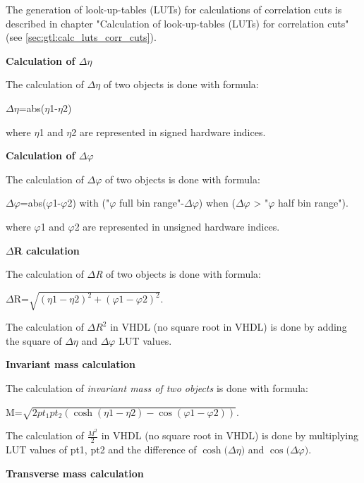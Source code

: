The generation of look-up-tables (LUTs) for calculations of correlation cuts is described in chapter "Calculation of look-up-tables (LUTs) for correlation cuts" (see \ref{sec:gtl:calc_luts_corr_cuts}).

\textbf{Calculation of $\Delta\eta$}
\label{sec:gtl:calculation_delta_eta}

The calculation of \textit{$\Delta\eta$} of two objects is done with formula:

$\Delta\eta$=abs($\eta$1-$\eta$2)

where $\eta$1 and $\eta$2 are represented in signed hardware indices.


\textbf{Calculation of $\Delta\varphi$}
\label{sec:gtl:calculation_delta_phi}

The calculation of \textit{$\Delta\varphi$} of two objects is done with formula:

$\Delta\varphi$=abs($\varphi$1-$\varphi$2) with ("$\varphi$ full bin range"-$\Delta\varphi$) when ($\Delta\varphi$ > "$\varphi$ half bin range").

where $\varphi$1 and $\varphi$2 are represented in unsigned hardware indices.

\textbf{$\Delta$R calculation}
\label{sec:gtl:delta_r_calculation}

The calculation of \textit{$\Delta$R} of two objects is done with formula:

$\Delta$R=$\sqrt{(\eta1-\eta2)^2+(\varphi1-\varphi2)^2}$.

The calculation of $\Delta$$R^2$ in VHDL (no square root in VHDL) is done by adding the square of $\Delta\eta$ and $\Delta\varphi$ LUT values.

\textbf{Invariant mass calculation}
\label{sec:gtl:inv_mass_calculation}

The calculation of \textit{invariant mass of two objects} is done with formula:

M=$\sqrt{2 pt_1  pt_2 (\cosh(\eta1-\eta2)-\cos(\varphi1-\varphi2))}$.

The calculation of $\frac{M^2}{2}$ in VHDL (no square root in VHDL) is done by multiplying LUT values of pt1, pt2 and the difference of $\cosh($$\Delta\eta$$)$ and $\cos($$\Delta\varphi$$)$.

\textbf{Transverse mass calculation}
\label{sec:gtl:transverse_mass_calculation}

